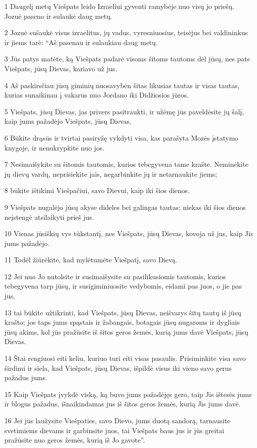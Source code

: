\par 1 Daugelį metų Viešpats leido Izraeliui gyventi ramybėje nuo visų jo priešų. Jozuė paseno ir sulaukė daug metų. 
\par 2 Jozuė sušaukė visus izraelitus, jų vadus, vyresniuosius, teisėjus bei valdininkus ir jiems tarė: “Aš pasenau ir sulaukiau daug metų. 
\par 3 Jūs patys matėte, ką Viešpats padarė visoms šitoms tautoms dėl jūsų, nes pats Viešpats, jūsų Dievas, kariavo už jus. 
\par 4 Aš paskirsčiau jūsų giminių nuosavybėn šitas likusias tautas ir visas tautas, kurias sunaikinau į vakarus nuo Jordano iki Didžiosios jūros. 
\par 5 Viešpats, jūsų Dievas, jas privers pasitraukti, ir užėmę jūs paveldėsite jų šalį, kaip jums pažadėjo Viešpats, jūsų Dievas. 
\par 6 Būkite drąsūs ir tvirtai pasiryžę vykdyti visa, kas parašyta Mozės įstatymo knygoje, ir nenukrypkite nuo jos. 
\par 7 Nesimaišykite su šitomis tautomis, kurios tebegyvena tame krašte. Neminėkite jų dievų vardų, neprisiekite jais, negarbinkite jų ir netarnaukite jiems; 
\par 8 būkite ištikimi Viešpačiui, savo Dievui, kaip iki šios dienos. 
\par 9 Viešpats nugalėjo jūsų akyse dideles bei galingas tautas; niekas iki šios dienos neįstengė atsilaikyti prieš jus. 
\par 10 Vienas jūsiškių vys tūkstantį, nes Viešpats, jūsų Dievas, kovoja už jus, kaip Jis jums pažadėjo. 
\par 11 Todėl žiūrėkite, kad mylėtumėte Viešpatį, savo Dievą. 
\par 12 Jei nuo Jo nutolsite ir susimaišysite su pasilikusiomis tautomis, kurios tebegyvena tarp jūsų, ir susigiminiuosite vedybomis, eidami pas juos, o jie pas jus, 
\par 13 tai būkite užtikrinti, kad Viešpats, jūsų Dievas, neišvarys šitų tautų iš jūsų krašto; jos taps jums spąstais ir žabangais, botagais jūsų nugaroms ir dygliais jūsų akims, kol jūs pražūsite iš šitos geros žemės, kurią jums davė Viešpats, jūsų Dievas. 
\par 14 Štai rengiuosi eiti keliu, kuriuo turi eiti visas pasaulis. Prisiminkite visa savo širdimi ir siela, kad Viešpats, jūsų Dievas, išpildė visus iki vieno savo gerus pažadus jums. 
\par 15 Kaip Viešpats įvykdė viską, ką buvo jums pažadėjęs gero, taip Jis ištesės jums ir blogus pažadus, išnaikindamas jus iš šitos geros žemės, kurią Jis jums davė. 
\par 16 Jei jūs laužysite Viešpaties, savo Dievo, jums duotą sandorą, tarnausite svetimiems dievams ir garbinsite juos, tai Viešpats baus jus ir jūs greitai pražūsite nuo geros žemės, kurią iš Jo gavote”.



